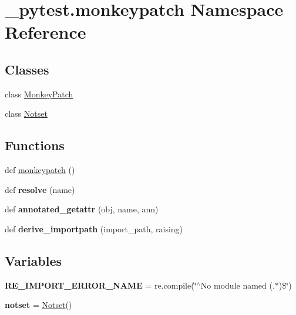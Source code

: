 \hypertarget{namespace__pytest_1_1monkeypatch}{}\section{\+\_\+pytest.\+monkeypatch Namespace Reference}
\label{namespace__pytest_1_1monkeypatch}
\subsection*{Classes}
\begin{DoxyCompactItemize}
\item 
class \hyperlink{class__pytest_1_1monkeypatch_1_1_monkey_patch}{Monkey\+Patch}
\item 
class \hyperlink{class__pytest_1_1monkeypatch_1_1_notset}{Notset}
\end{DoxyCompactItemize}
\subsection*{Functions}
\begin{DoxyCompactItemize}
\item 
def \hyperlink{namespace__pytest_1_1monkeypatch_a68649128026af8df237c5c5d5dea5e42}{monkeypatch} ()
\item 
\mbox{\label{namespace__pytest_1_1monkeypatch_a8f767078fce67c657740d225f21e6303}} 
def {\bfseries resolve} (name)
\item 
\mbox{\label{namespace__pytest_1_1monkeypatch_af7bca1edba79b5c19cf2eefd4db3af17}} 
def {\bfseries annotated\+\_\+getattr} (obj, name, ann)
\item 
\mbox{\label{namespace__pytest_1_1monkeypatch_adfa7202c05dcd84c03e01ff5c1bce66a}} 
def {\bfseries derive\+\_\+importpath} (import\+\_\+path, raising)
\end{DoxyCompactItemize}
\subsection*{Variables}
\begin{DoxyCompactItemize}
\item 
\mbox{\label{namespace__pytest_1_1monkeypatch_a1559cc12f8195a1c4599f784e204acc3}} 
{\bfseries R\+E\+\_\+\+I\+M\+P\+O\+R\+T\+\_\+\+E\+R\+R\+O\+R\+\_\+\+N\+A\+ME} = re.\+compile(\char`\"{}$^\wedge$No module named (.$\ast$)\$\char`\"{})
\item 
\mbox{\label{namespace__pytest_1_1monkeypatch_a509b82e5508ffff5f228c76b385e1b44}} 
{\bfseries notset} = \hyperlink{class__pytest_1_1monkeypatch_1_1_notset}{Notset}()
\end{DoxyCompactItemize}


